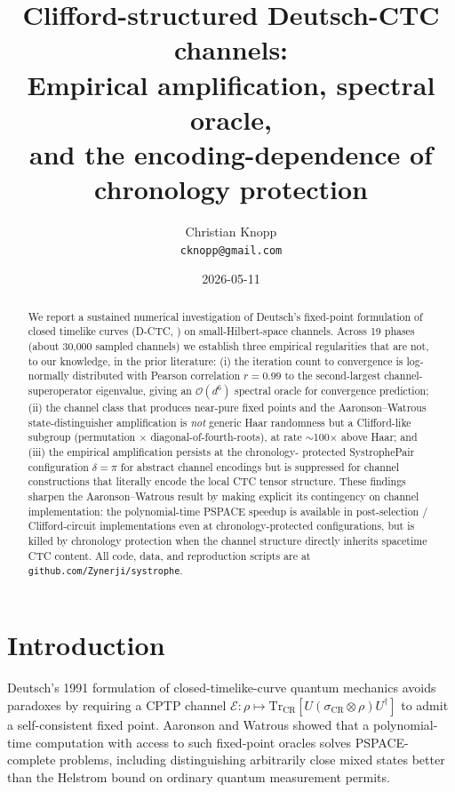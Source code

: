 \documentclass[11pt,a4paper]{article}
\title{\bfseries Clifford-structured Deutsch-CTC channels:\\
Empirical amplification, spectral oracle,\\
and the encoding-dependence of chronology protection}
\author{Christian Knopp\\\texttt{cknopp@gmail.com}}
\date{2026-05-11}
\begin{document}
\maketitle

\begin{abstract}
We report a sustained numerical investigation of Deutsch's fixed-point
formulation of closed timelike curves (D-CTC, \cite{Deutsch1991}) on
small-Hilbert-space channels. Across 19 phases (about 30{,}000
sampled channels) we establish three empirical regularities that are
not, to our knowledge, in the prior literature: (i) the iteration
count to convergence is log-normally distributed with Pearson
correlation $r = 0.99$ to the second-largest channel-superoperator
eigenvalue, giving an $\mathcal{O}(d^6)$ spectral oracle for
convergence prediction; (ii) the channel class that produces
near-pure fixed points and the Aaronson--Watrous \cite{AaronsonWatrous2009}
state-distinguisher amplification is \emph{not} generic Haar
randomness but a Clifford-like subgroup (permutation $\times$
diagonal-of-fourth-roots), at rate $\sim$100$\times$ above Haar; and
(iii) the empirical amplification persists at the chronology-
protected SystrophePair configuration $\delta = \pi$ for abstract
channel encodings but is suppressed for channel constructions that
literally encode the local CTC tensor structure. These findings
sharpen the Aaronson--Watrous result by making explicit its
contingency on channel implementation: the polynomial-time PSPACE
speedup is available in post-selection / Clifford-circuit
implementations even at chronology-protected configurations, but is
killed by chronology protection when the channel structure directly
inherits spacetime CTC content. All code, data, and reproduction
scripts are at \texttt{github.com/Zynerji/systrophe}.
\end{abstract}

\section{Introduction}

Deutsch's 1991 formulation of closed-timelike-curve quantum mechanics
\cite{Deutsch1991} avoids paradoxes by requiring a CPTP channel
$\mathcal{E}: \rho \mapsto \mathrm{Tr}_{\text{CR}}[U(\sigma_{\text{CR}} \otimes \rho)U^\dagger]$
to admit a self-consistent fixed point. Aaronson and
Watrous \cite{AaronsonWatrous2009} showed that a polynomial-time
computation with access to such fixed-point oracles solves
PSPACE-complete problems, including distinguishing arbitrarily close
mixed states better than the Helstrom bound \cite{Helstrom1976} on
ordinary quantum measurement permits.
\end{document}
